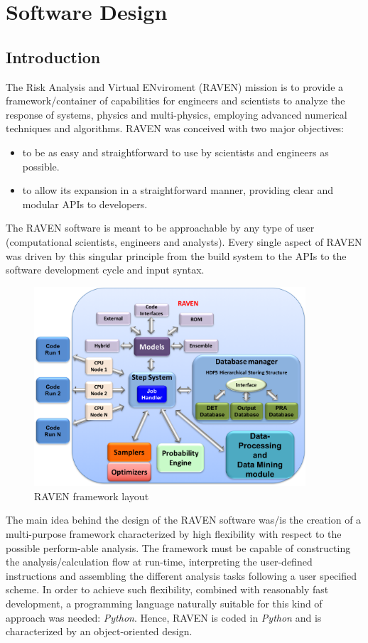 \section{Software Design}
\subsection{Introduction}
The Risk Analysis and Virtual ENviroment (RAVEN) mission is to provide a framework/container of capabilities for 
engineers and scientists to analyze the response of systems, physics and multi-physics, employing advanced numerical
techniques and algorithms.
RAVEN was conceived with two major objectives: 
\begin{itemize}
  \item  to be as easy and straightforward to use by scientists and engineers as possible. 
  \item to allow its expansion in a straightforward manner, providing clear and modular APIs  to developers.
\end{itemize}

The RAVEN software is meant to be approachable by any type of user (computational scientists, engineers and analysts). 
Every single aspect of RAVEN was driven by this singular principle from the build system to the APIs to the software development cycle and input syntax.

\begin{figure}[ht]
  \centering
  \includegraphics[width=0.9\textwidth]  {pics/RavenFramework.png}
  \caption{RAVEN framework layout}
  \label{fig:RAVENframeworkLayout}
\end{figure}

The main idea behind the design of the RAVEN software was/is the creation of a multi-purpose framework characterized by 
high flexibility with respect to the possible perform-able analysis. The framework must be capable of constructing the 
analysis/calculation flow at run-time, interpreting the user-defined instructions and assembling the different analysis tasks 
following a user specified scheme.
In order to achieve such flexibility, combined with reasonably fast development, a programming language naturally suitable 
for this kind of approach was needed: \emph{Python}.
Hence, RAVEN is coded in \emph{Python} and is characterized by an object-oriented design.

